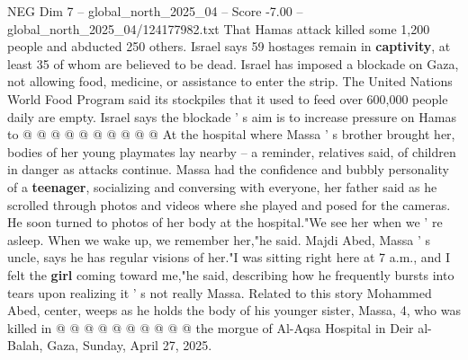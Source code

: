 \begin{textsample}{NEG Dim 7 – global\_north\_2025\_04 – Score -7.00 – global\_north\_2025\_04/124177982.txt}
That Hamas attack killed some 1,200 people and abducted 250 others.
Israel says 59 hostages remain in \textbf{captivity}, at least 35 of whom are believed to be dead.
Israel has imposed a blockade on Gaza, not allowing food, medicine, or assistance to enter the strip.
The United Nations World Food Program said its stockpiles that it used to feed over 600,000 people daily are empty.
Israel says the blockade ' s aim is to increase pressure on Hamas to @ @ @ @ @ @ @ @ @ @ At the hospital where Massa ' s brother brought her, bodies of her young playmates lay nearby -- a reminder, relatives said, of children in danger as attacks continue.
Massa had the confidence and bubbly personality of a \textbf{teenager}, socializing and conversing with everyone, her father said as he scrolled through photos and videos where she played and posed for the cameras.
He soon turned to photos of her body at the hospital."We see her when we ' re asleep.
When we wake up, we remember her,"he said.
Majdi Abed, Massa ' s uncle, says he has regular visions of her."I was sitting right here at 7 a.m., and I felt the \textbf{girl} coming toward me,"he said, describing how he frequently bursts into tears upon realizing it ' s not really Massa.
Related to this story Mohammed Abed, center, weeps as he holds the body of his younger sister, Massa, 4, who was killed in @ @ @ @ @ @ @ @ @ @ the morgue of Al-Aqsa Hospital in Deir al-Balah, Gaza, Sunday, April 27, 2025.

\end{textsample}

